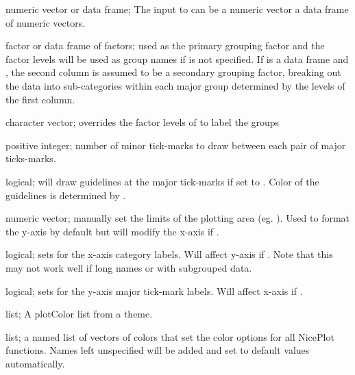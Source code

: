 \documentclass[a4paper]{book}
\begin{document}
\begin{Arguments}
\begin{ldescription}
\item[\code{x}] numeric vector or data frame; The input to  can be a numeric vector a  data frame of numeric vectors.

\item[\code{by}] factor or data frame of factors; used as the primary grouping factor and the factor levels will be used as group names if  is not specified. If  is a data frame and , the second column is assumed to be a secondary grouping factor, breaking out the data into sub-categories within each major group determined by the levels of the first column.

\item[\code{groupNames}] character vector; overrides the factor levels of  to label the groups

\item[\code{minorTick}] positive integer; number of minor tick-marks to draw between each pair of major ticks-marks.

\item[\code{guides}] logical; will draw guidelines at the major tick-marks if set to . Color of the guidelines is determined by .

\item[\code{yLim}] numeric vector; manually set the limits of the plotting area (eg. ). Used to format the y-axis by default but will modify the x-axis if .

\item[\code{rotateLabels}] logical; sets  for the x-axis category labels. Will affect y-axis if . Note that this may not work well if long names or with subgrouped data.

\item[\code{rotateY}] logical; sets  for the y-axis major tick-mark labels. Will affect x-axis if .

\item[\code{theme}] list; A  plotColor list from a theme.

\item[\code{plotColors}] list; a named list of vectors of colors that set the color options for all NicePlot functions. Names left unspecified will be added and set to default values automatically.


\end{ldescription}
\end{Arguments}
\end{document}
